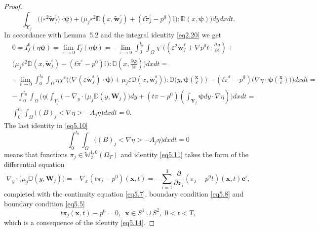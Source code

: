 \documentclass{article}
\theoremstyle{plain}
\theoremstyle{definition}
\numberwithin{equation}{section}
\begin{document}
\begin{proof}
\begin{equation*}
\int_{\textbf{Y}_{f}}\Big(\big(\varepsilon^{2}
\widetilde{\boldsymbol{w}}_{f}^{\varepsilon})\cdot\boldsymbol{\psi}\big)+
\big(\mu_{j}\varepsilon^{2}\mathbb{D}(x,\widetilde{\boldsymbol{w}}_{j}^{\varepsilon})+
(t\widetilde{{\pi}}^{\varepsilon}_{j}-{p}^{0})\mathbb{I}\big):\mathbb{D}(x,\boldsymbol{\psi})\Big)dydxdt.
\end{equation*}
In accordance with Lemma~5.2 and the integral identity \eqref{eq2.20} we get
\begin{equation}\label{eq5.10}
\begin{aligned}
& 
0={I}^{0}_{f}(\eta\boldsymbol{\psi})=
\lim_{\varepsilon\rightarrow{0}}I^{\varepsilon}_{f}(\eta\boldsymbol{\psi})=
-\lim_{\varepsilon\rightarrow{0}}\int_{0}^{t_{0}}\int_{\Omega}\chi^{\varepsilon}
\Big((\varepsilon^{2}\widetilde{\boldsymbol{w}}_{f}^{\varepsilon}+\nabla{p}^{0}t\cdot
\frac{\partial\boldsymbol{\varphi}}{\partial{t}})+
\\
& \big(\mu_{j}\varepsilon^{2}\mathbb{D}(x,\widetilde{\boldsymbol{w}}_{j}^{\varepsilon})-
(t\widetilde{{\pi}}^{\varepsilon}-{p}^{0})\mathbb{I}\big):
\mathbb{D}(x,\frac{\partial\boldsymbol{\varphi}}{\partial{t}})\Big)dxdt=
\\
& -\lim_{\varepsilon\rightarrow{0}}\int_{0}^{t_{0}}\int_{\Omega}\eta\chi^{\varepsilon}
\Big(\big(\nabla(\varepsilon\widetilde{\boldsymbol{w}}_{f}^{\varepsilon})\cdot\boldsymbol{\psi}\big)+
\mu_{j}\varepsilon\mathbb{D}(x,\widetilde{\boldsymbol{w}}_{j}^{\varepsilon})\big):
\mathbb{D}\big(y,\boldsymbol{\psi}(\frac{\boldsymbol{x}}{\varepsilon})\big)-
(t\widetilde{{\pi}}^{\varepsilon}-{p}^{0})\big(\nabla\eta\cdot
\boldsymbol{\psi}(\frac{\boldsymbol{x}}{\varepsilon})\big)\Big)dxdt=
\\
& -\int_{0}^{t_{0}}\int_{\Omega}\Big(\eta\big(\int_{Y_{f}}\big(-\nabla_{y}\cdot
\big(\mu_{j}\mathbb{D}(y,\boldsymbol{W}_{j})
\big)dy+(t{\pi}-{p}^{0})(\int_{\textbf{Y}_{f}}\boldsymbol{\psi}dy\cdot\nabla\eta)\Big)dxdt=
\\
& \int_{0}^{t_{0}}\int_{\Omega}\big((B)_{j}<\nabla\eta>-A_{j}\eta\big)dxdt=0.
\end{aligned}
\end{equation}
The last identity in \eqref{eq5.10}
\begin{equation}\label{eq5.11}
\int_{0}^{t_{0}}\int_{\Omega}\big((B)_{j}<\nabla\eta>-A_{j}\eta\big)dxdt=0
\end{equation}
means that functions ${\pi}_{j}\in\mathbb{W}^{1,0}_{2}(\Omega_{T})$ and identity
\eqref{eq5.11} takes the form of the differential equation
\begin{equation}\label{eq5.12}
\nabla_{y}\cdot\big(\mu_{j}\mathbb{D}(y,\boldsymbol{W}_{j})\big)=
-\nabla_{x}(t\pi_{j}-{p}^{0})(\boldsymbol{x},t)=
-\sum_{i=1}^{3}\frac{\partial{}}{\partial{x_{i}}}({\pi}_{j}-{p}^{0}t)(\boldsymbol{x},t)\boldsymbol{e}^{i},
\end{equation}
completed with the continuity equation \eqref{eq5.7}, boundary condition \eqref{eq5.8} and boundary condition \eqref{eq5.5}
\begin{equation}\label{eq5.13}
t\pi_{j}(\boldsymbol{x},t)-{p}^{0}=0,\,\,\,\boldsymbol{x}\in{S}^{1}\cup{S}^{2},\,\,0<t<T,
\end{equation}
which is a consequence of the identity \eqref{eq5.14}.


\end{proof}
\end{document}
